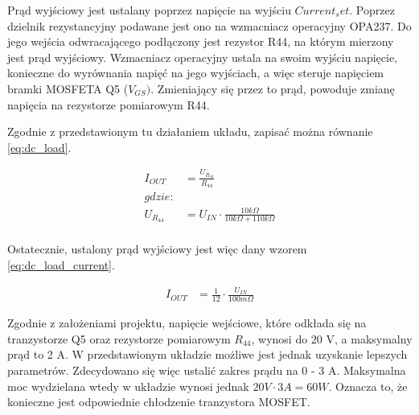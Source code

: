 Prąd wyjściowy jest ustalany poprzez napięcie na wyjściu $Current_set$. Poprzez dzielnik rezystancyjny podawane jest ono na wzmacniacz 
operacyjny OPA237. Do jego wejścia odwracającego podłączony jest rezystor R44, na którym mierzony jest prąd wyjściowy.
Wzmacniacz operacyjny ustala na swoim wyjściu napięcie, konieczne do wyrównania napięć na jego wyjściach, a więc 
steruje napięciem bramki MOSFETA Q5 ($V_{GS})$. Zmieniający się przez to prąd, powoduje zmianę napięcia na rezystorze pomiarowym R44.

Zgodnie z przedstawionym tu działaniem układu, zapisać można równanie \ref{eq:dc_load}.

\begin{equation}
    \label{eq:dc_load}
    \begin{aligned}
        I_{OUT} &= \frac{U_{R_{44}}}{R_{44}} \\
        gdzie: \\
        U_{R_{44}} &= U_{IN} \cdot \frac{10k \Omega}{10k \Omega + 110k \Omega}  \\
    \end{aligned}
\end{equation}

Ostatecznie, ustalony prąd wyjściowy jest więc dany wzorem \ref{eq:dc_load_current}.

\begin{equation}
    \label{eq:dc_load_current}
    \begin{aligned}
        I_{OUT} &= \frac{1}{12} \cdot \frac{U_{IN}}{100 m\Omega}
    \end{aligned}
\end{equation}

Zgodnie z założeniami projektu, napięcie wejściowe, które odkłada się na tranzystorze Q5 oraz rezystorze pomiarowym 
$R_{44}$, wynosi do 20 V, a maksymalny prąd to 2 A. W przedstawionym układzie możliwe jest jednak uzyskanie lepszych
parametrów. Zdecydowano się więc ustalić zakres prądu na 0 - 3 A. Maksymalna moc wydzielana wtedy w układzie wynosi jednak
$20 V \cdot 3 A = 60 W$. Oznacza to, że konieczne jest odpowiednie chłodzenie tranzystora MOSFET. 

